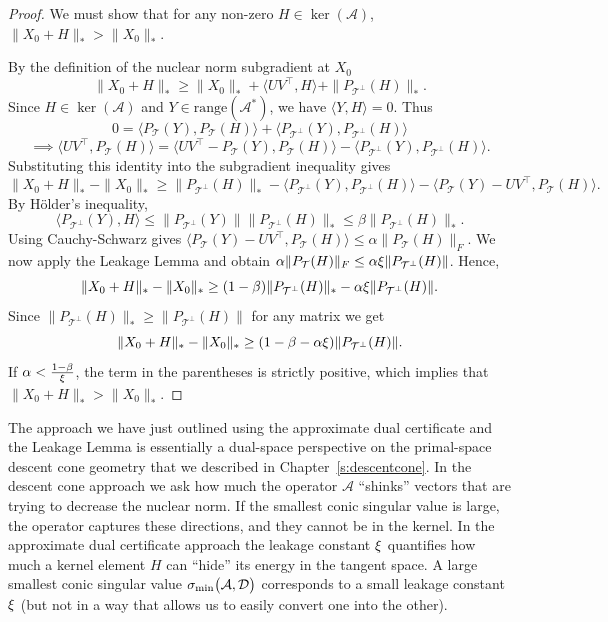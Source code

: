 \begin{proof}
We must show that for any non-zero $H \in \ker(\mathcal{A})$, $\|X_0 + H\|_* > \|X_0\|_*$.

By the definition of the nuclear norm subgradient at $X_0$
$$\|X_0 + H\|_* \ge \|X_0\|_* + \langle UV^\top, H \rangle + \|P_{\mathcal{T}^\perp}(H)\|_*.$$
Since $H \in \ker(\mathcal{A})$ and $Y \in \text{range}(\mathcal{A}^*)$, we have $\langle Y, H \rangle = 0$. Thus
$$0 = \langle P_{\mathcal{T}}(Y), P_{\mathcal{T}}(H) \rangle + \langle P_{\mathcal{T}^\perp}(Y), P_{\mathcal{T}^\perp}(H) \rangle$$
$$\implies \langle UV^\top, P_{\mathcal{T}}(H) \rangle = \langle UV^\top - P_{\mathcal{T}}(Y), P_{\mathcal{T}}(H) \rangle - \langle P_{\mathcal{T}^\perp}(Y), P_{\mathcal{T}^\perp}(H) \rangle.$$
Substituting this identity into the subgradient inequality gives
$$\|X_0 + H\|_* - \|X_0\|_* \ge \|P_{\mathcal{T}^\perp}(H)\|_* - \langle P_{\mathcal{T}^\perp}(Y), P_{\mathcal{T}^\perp}(H) \rangle - \langle P_{\mathcal{T}}(Y) - UV^\top, P_{\mathcal{T}}(H) \rangle.$$
By H\"{o}lder's inequality, 
$$\langle P_{\mathcal{T}^\perp}(Y), H \rangle \le \|P_{\mathcal{T}^\perp}(Y)\| \|P_{\mathcal{T}^\perp}(H)\|_* \le \beta \|P_{\mathcal{T}^\perp}(H)\|_*.$$
Using Cauchy-Schwarz gives $\langle P_{\mathcal{T}}(Y) - UV^\top, P_{\mathcal{T}}(H) \rangle \le \alpha \|P_{\mathcal{T}}(H)\|_F$.
We now apply the Leakage Lemma and obtain
$\alpha \|P_{\mathcal{T}}(H)\|_F \le \alpha \xi \|P_{\mathcal{T}^\perp}(H)\|$.
Hence,
$$\|X_0 + H\|_* - \|X_0\|_* \ge (1-\beta) \|P_{\mathcal{T}^\perp}(H)\|_* - \alpha \xi \|P_{\mathcal{T}^\perp}(H)\|.$$
Since $\|P_{\mathcal{T}^\perp}(H)\|_* \ge \|P_{\mathcal{T}^\perp}(H)\|$ for any matrix we get
$$\|X_0 + H\|_* - \|X_0\|_* \ge (1 - \beta - \alpha \xi) \|P_{\mathcal{T}^\perp}(H)\|.$$
If $\alpha < \frac{1-\beta}{\xi}$, the term in the parentheses is strictly positive, which implies that $\|X_0 + H\|_* > \|X_0\|_*$.  
\end{proof}

\begin{remark}
The approach we have just outlined using the approximate dual certificate and the Leakage Lemma is essentially a dual-space perspective on the primal-space descent cone geometry that we described in Chapter~\ref{s:descentcone}.
In the descent cone approach we ask how much the operator $\mathcal{A}$ ``shinks'' vectors that are trying to decrease the nuclear norm. If the smallest conic singular value is large, the operator captures these directions, and they cannot be in the kernel. In the approximate dual certificate approach the leakage constant $\xi$ quantifies how much a kernel element $H$ can ``hide'' its energy in the tangent space. A large smallest conic singular value
$\sigma_{\min}\big({\mathcal A},\mathcal{D}\big)$  corresponds to a small leakage constant $\xi$ (but not in a way that allows us to easily convert one into the other).
\end{remark}



